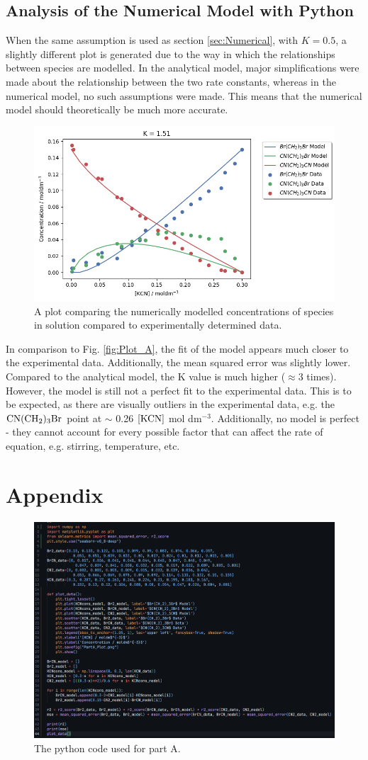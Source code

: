 \documentclass[twoside, 11pt]{article}
\begin{document}
\subsection{Analysis of the Numerical Model with Python}
When the same assumption is used as section \ref{sec:Numerical}, with $K=0.5$, a slightly different plot is generated due to the way in which the relationships between species are modelled. In the analytical model, major simplifications were made about the relationship between the two rate constants, whereas in the numerical model, no such assumptions were made. This means that the numerical model should theoretically be much more accurate.
\begin{figure}[H]
    \centering
    \includegraphics[width=0.8\linewidth]{PartB_Plot.png}
    \caption{A plot comparing the numerically modelled concentrations of species in solution compared to experimentally determined data.}
    \label{fig:Plot_B}
\end{figure}
In comparison to Fig. \ref{fig:Plot_A}, the fit of the model appears much closer to the experimental data. Additionally, the mean squared error was slightly lower. Compared to the analytical model, the K value is much higher ($\approx 3$ times). However, the model is still not a perfect fit to the experimental data. This is to be expected, as there are visually outliers in the experimental data, e.g. the $\ce{CN(CH2)3Br}$ point at $\sim$ 0.26 $\ce{[KCN]}$ mol dm$^{-3}$. Additionally, no model is perfect - they cannot account for every possible factor that can affect the rate of equation, e.g. stirring, temperature, etc.
\section{Appendix}
\begin{figure}[H]
    \centering 
    \includegraphics[width=0.9\linewidth]{PartA.png}
    \caption{The python code used for part A.}
\end{figure}


\end{document}
